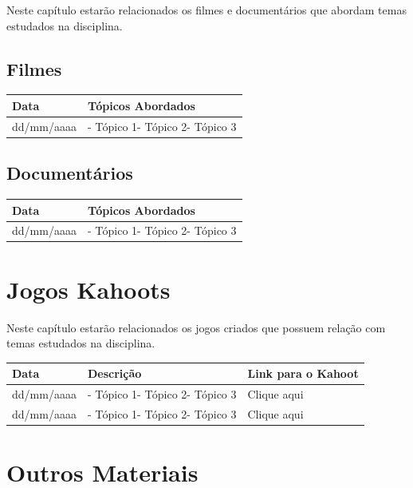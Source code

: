 \documentclass[
]{book}
\begin{document}
Neste capítulo estarão relacionados os filmes e documentários que abordam temas estudados na disciplina.

\hypertarget{filmes-1}{%
\section{Filmes}\label{filmes-1}}

\begin{longtable}[]{@{}ll@{}}
\toprule()
Data & Tópicos Abordados \\
\midrule()
\endhead
dd/mm/aaaa & - Tópico 1- Tópico 2- Tópico 3 \\
\bottomrule()
\end{longtable}

\hypertarget{documentuxe1rios-1}{%
\section{Documentários}\label{documentuxe1rios-1}}

\begin{longtable}[]{@{}ll@{}}
\toprule()
Data & Tópicos Abordados \\
\midrule()
\endhead
dd/mm/aaaa & - Tópico 1- Tópico 2- Tópico 3 \\
\bottomrule()
\end{longtable}

\hypertarget{jogos-kahoots-1}{%
\chapter{Jogos Kahoots}\label{jogos-kahoots-1}}

Neste capítulo estarão relacionados os jogos criados que possuem relação com temas estudados na disciplina.

\begin{longtable}[]{@{}lll@{}}
\toprule()
Data & Descrição & Link para o Kahoot \\
\midrule()
\endhead
dd/mm/aaaa & - Tópico 1- Tópico 2- Tópico 3 & Clique aqui \\
dd/mm/aaaa & - Tópico 1- Tópico 2- Tópico 3 & Clique aqui \\
\bottomrule()
\end{longtable}

\hypertarget{outros-materiais-1}{%
\chapter{Outros Materiais}\label{outros-materiais-1}}
\end{document}
